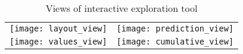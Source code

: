 \documentclass{acm_proc_article-sp}
\begin{document}
\begin{table*}[b]
  \caption{Views of interactive exploration tool} \label{tab:inspector}
  \begin{tabular}
      {ll}
      \texttt{[image: layout\_view]} &
      \texttt{[image: prediction\_view]} \\
      \texttt{[image: values\_view]} &
      \texttt{[image: cumulative\_view]} \\
 \end{tabular}
\end{table*}




\end{document}
